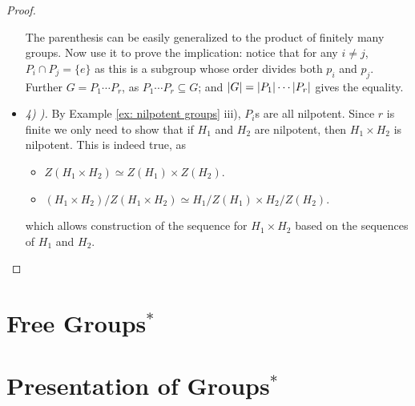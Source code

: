 \documentclass{article}
\begin{document}
\begin{proof}
\begin{itemize}
        The parenthesis can be easily generalized to the product of finitely many groups. Now use it to prove the implication: notice that for any $i \neq j$, $P_i \cap P_j = \{e\}$ as this is a subgroup whose order divides both $p_i$ and $p_j$. Further $G = P_1 \cdots P_r$, as $P_1 \cdots P_r \subseteq G$; and $\left|G\right| = \left|P_1\right| \cdots \left|P_r\right|$ gives the equality.
        \item \emph{4) ).} By Example \ref{ex: nilpotent groups} iii), $P_i$s are all nilpotent. Since $r$ is finite we only need to show that if $H_1$ and $H_2$ are nilpotent, then $H_1 \times H_2$ is nilpotent. This is indeed true, as
        \begin{itemize}
            \item $Z(H_1 \times H_2) \simeq Z(H_1) \times Z(H_2)$.
            \item $(H_1 \times H_2)/Z(H_1 \times H_2) \simeq H_1/Z(H_1) \times H_2/Z(H_2)$.
        \end{itemize}
        which allows construction of the sequence for $H_1 \times H_2$ based on the sequences of $H_1$ and $H_2$.
    \end{itemize}
\end{proof}

\section{Free Groups$^{\ast}$}

\section{Presentation of Groups$^{\ast}$}
\end{document}
